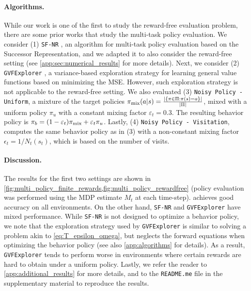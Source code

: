 \paragraph{Algorithms.} While our work is one of the first to study the reward-free evaluation problem, there are some prior works that study the multi-task policy evaluation. We consider (1) {\tt SF-NR} \cite{mcleod2021continual}, an algorithm for multi-task policy evaluation based on the Successor Representation, and we adapted it to also consider the reward-free setting (see \cref{app:sec:numerical_results} for more details). Next, we consider (2) {\tt GVFExplorer} \cite{jain2024adaptive}, a variance-based exploration strategy for learning general value functions \cite{sutton2011horde} based on minimizing the MSE. However, such exploration strategy is not applicable to the reward-free setting. We also evaluated
(3) {\tt Noisy Policy - Uniform}, a mixture of the target policies $\pi_{\rm mix}(a|s) = \frac{|\{\pi\in \Pi: \pi(s)=a\}|}{|\Pi|}$,  mixed with a uniform policy $\pi_u$ with a constant mixing factor $\varepsilon_t=0.3$. The resulting behavior policy is $\pi_b =(1-\varepsilon_t)\pi_{\rm mix} +\varepsilon_t \pi_u$. Lastly, (4) {\tt Noisy Policy - Visitation}, computes the same behavior policy as in (3)  with a non-constant mixing factor $\epsilon_t=1/N_t(s_t)$, which is based on the number of visits.

\paragraph{Discussion.} The results for the first two settings are shown in \cref{fig:multi_policy_finite_rewards,fig:multi_policy_rewardfree} (policy evaluation was performed using the MDP estimate $M_t$ at each time-step).  \mrnas{} achieves good accuracy on all environments. On the other hand,  {\tt SF-NR} and {\tt GVFExplorer}  have mixed performance. While {\tt SF-NR} is not designed to optimize a behavior policy, we note that the exploration strategy used by {\tt GVFExplorer} is similar to solving a problem akin to \cref{eq:T_epsilon_omega}, but neglects the forward equations when optimizing the behavior policy (see also \cref{app:algorithms} for details).  
As a result, {\tt GVFExplorer} tends to perform worse in environments where certain rewards are hard to obtain under a uniform policy. Lastly, we refer the reader to \cref{app:additional_results} for more details, and to the {\tt README.me} file in the supplementary material to reproduce the results.
